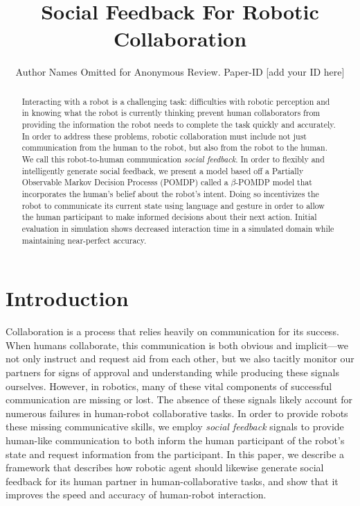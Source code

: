 \documentclass[conference]{IEEEtran}
\begin{document}
\title{Social Feedback For Robotic Collaboration}
\author{Author Names Omitted for Anonymous Review. Paper-ID [add your ID here]}


\maketitle


\begin{abstract}
	Interacting with a robot is a challenging task: difficulties with robotic perception and in knowing what the robot is currently thinking prevent human collaborators from providing the information the robot needs to complete the task quickly and accurately. In order to address these problems, robotic collaboration must include not just communication from the human to the robot, but also from the robot to the human. We call this robot-to-human communication \emph{social feedback}. In order to flexibly and intelligently generate social feedback, we present a model based off a Partially Observable Markov Decision Processs (POMDP) called a $\beta$-POMDP model that incorporates the human's belief about the robot's intent. Doing so incentivizes the robot to communicate its current state using language and gesture in order to allow the human participant to make informed decisions about their next action. Initial evaluation in simulation shows decreased interaction time in a simulated domain while maintaining near-perfect accuracy. 
\end{abstract}

	
\section{Introduction}

Collaboration is a process that relies heavily on communication for its success. When humans collaborate, this communication is both obvious and implicit---we not only instruct and request aid from each other, but we also tacitly monitor our partners for signs of approval and understanding while producing these signals ourselves. However, in robotics, many of these vital components of successful communication are missing or lost. The absence of these signals likely account for numerous failures in human-robot collaborative tasks. In order to provide robots these missing communicative skills, we employ \emph{social feedback} signals to provide human-like communication to both inform the human participant of the robot's state and request information from the participant. In this paper, we describe a  framework that describes how robotic agent should likewise generate social feedback for its human partner in human-collaborative tasks, and show that it improves the speed and accuracy of human-robot interaction. 
\end{document}
